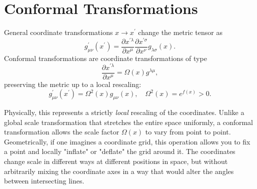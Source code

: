 \section{Conformal Transformations}
General coordinate transformations \(x\rightarrow x^{\prime}\) change the metric tensor as
\[
    g_{\mu\nu}^{\prime}(x^{\prime})=\frac{\partial x^{\prime\lambda}}{\partial x^{\mu}}\frac{\partial x^{\prime\sigma}}{\partial x^{\nu}}g_{\lambda\sigma}(x).
\]
Conformal transformations are coordinate transformations of type
\[
    \frac{\partial x^{\prime\lambda}}{\partial x^{\mu}}=\Omega(x)g^{\lambda\mu},
\]
preserving the metric up to a local rescaling:
\[
    g_{\mu\nu}^{\prime}(x^{\prime})=\Omega^{2}(x)g_{\mu\nu}(x), \quad \Omega^{2}(x)=e^{f(x)}>0.
\]

Physically, this represents a strictly \textit{local} rescaling of the coordinates. Unlike a global scale transformation that stretches the entire space uniformly, a conformal transformation allows the scale factor \(\Omega(x)\) to vary from point to point. Geometrically, if one imagines a coordinate grid, this operation allows you to fix a point and locally "inflate" or "deflate" the grid around it. The coordinates change scale in different ways at different positions in space, but without arbitrarily mixing the coordinate axes in a way that would alter the angles between intersecting lines.

